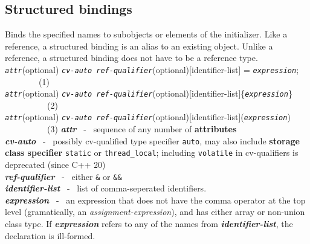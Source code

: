 \documentclass{report}
\begin{document}
\subsection{Structured bindings}
Binds the specified names to subobjects or elements of the initializer. Like a reference, a structured binding is an alias to an existing object. Unlike a reference, a structured binding does not have to be a reference type.
\textit{\texttt{attr}}(optional) \textit{\texttt{cv-auto ref-qualifier}}(optional)[identifier-list] = \textit{\texttt{expression}};      \ \ \ \ \ \ \ \  (1) \vspace{1.5mm} \\
\textit{\texttt{attr}}(optional) \textit{\texttt{cv-auto ref-qualifier}}(optional)[identifier-list]\{\textit{\texttt{expression}}\}      \ \ \ \ \ \ \ \ \ \  (2) \vspace{1.5mm} \\
\textit{\texttt{attr}}(optional) \textit{\texttt{cv-auto ref-qualifier}}(optional)[identifier-list](\textit{\texttt{expression}})      \ \ \ \ \ \ \ \ \ \  (3)
\bigbreak \noindent
\textit{\textbf{attr}} \ - \ sequence of any number of \textbf{attributes} \vspace{2mm} \\
\textit{\textbf{cv-auto}} \ - \ possibly cv-qualified type specifier \texttt{auto}, may also include \textbf{storage class specifier} \texttt{static} or \texttt{thread\_local}; including \texttt{volatile} in cv-qualifiers is deprecated (since C++ 20) \vspace{2mm} \\
\textit{\textbf{ref-qualifier}} \ - \ either \texttt{\&} or \texttt{\&\&} \vspace{2mm} \\
\textit{\textbf{identifier-list}} \ - \ list of comma-seperated identifiers. \vspace{2mm} \\
\textit{\textbf{expression}} \ - \ an expression that does not have the comma operator at the top level (gramatically, an \textit{assignment-expression}), and has either array or non-union class type. If \textit{\textbf{expression}} refers to any of the names from \textit{\textbf{identifier-list}}, the declaration is ill-formed.
\end{document}
